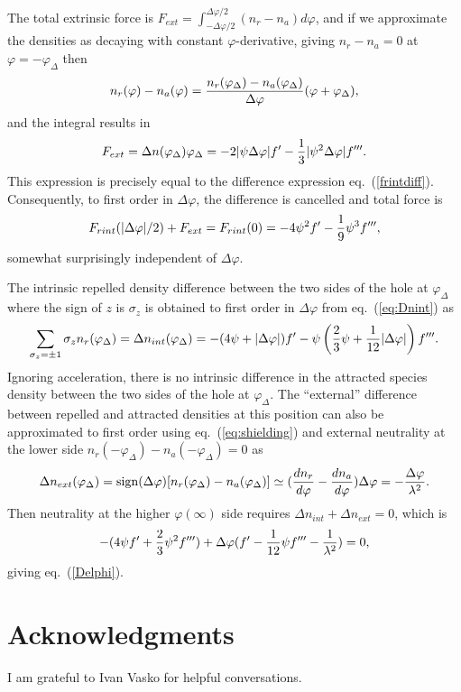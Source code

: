 \documentclass[aip,pop,article-title]{revtex4-2}
\begin{document}
The total extrinsic force is
$F_{ext}=\int_{-\Delta\varphi/2}^{\Delta\varphi/2} (n_r-n_a)d\varphi$,
and if we approximate the densities as decaying with constant
$\varphi$-derivative, giving $n_r-n_a=0$ at
$\varphi=-\varphi_\Delta$
 then
 \begin{equation}
n_r(\varphi)-n_a(\varphi)={n_r(\varphi_\Delta)-n_a(\varphi_\Delta)\over\Delta\varphi}(\varphi+\varphi_\Delta),
 \end{equation}
and the integral
results in
\begin{equation}
F_{ext}=\Delta n(\varphi_\Delta)
\varphi_\Delta=-2|\psi\Delta\varphi| f'-{1\over 3}|\psi^2\Delta\varphi|
f'''.  
\end{equation}
This expression is precisely equal to the difference expression eq.\
(\ref{frintdiff}). Consequently, to first order in $\Delta\varphi$,
the difference is cancelled and total force is
\begin{equation}
  \label{totalforce}
  F_{rint}(|\Delta\varphi|/2)+F_{ext}=F_{rint}(0)=-4\psi^2f'-{1\over9}{\psi}^3f''',
\end{equation}
somewhat surprisingly independent of $\Delta\varphi$.

The intrinsic repelled density difference between the two sides of the
hole at $\varphi_\Delta$ where the sign of $z$ is $\sigma_z$ is
obtained to first order in $\Delta\varphi$ from eq.\ (\ref{eq:Dnint})
as
\begin{equation}
\sum_{\sigma_z=\pm1}  \sigma_zn_r(\varphi_\Delta)=  \Delta n_{int}(\varphi_\Delta)=-(4{\psi}+|\Delta\varphi|)f'
-{\psi}\left({2\over3}{\psi}+{1\over12}|\Delta\varphi|\right)f'''.
\end{equation}
Ignoring acceleration, there is no intrinsic difference in the
attracted species density between the two sides of the hole at
$\varphi_\Delta$. The ``external'' difference between repelled and
attracted densities at this position can also be approximated to first
order using eq.\ (\ref{eq:shielding}) and external neutrality at the
lower side $n_r(-\varphi_\Delta)-n_a(-\varphi_\Delta)=0$ as
\begin{equation}
\Delta n_{ext}(\varphi_\Delta)= {\rm sign}(\Delta\varphi)[ n_r(\varphi_\Delta)-n_a(\varphi_\Delta)]\simeq
({dn_r\over d\varphi}-{dn_a\over d\varphi})\Delta\varphi=
-{\Delta\varphi\over \lambda^2}.
\end{equation}
Then neutrality at the higher $\varphi(\infty)$ side requires $\Delta
n_{int}+\Delta n_{ext}=0$, which is
\begin{equation}
  -(4{\psi}f'+{2\over3}\psi^2f''')+\Delta\varphi(f'-{1\over12}{\psi}f'''-{1\over \lambda^2})=0,
\end{equation}
giving eq.\ (\ref{Delphi}).

\section*{Acknowledgments}
I am grateful to Ivan Vasko for helpful conversations.


\end{document}
